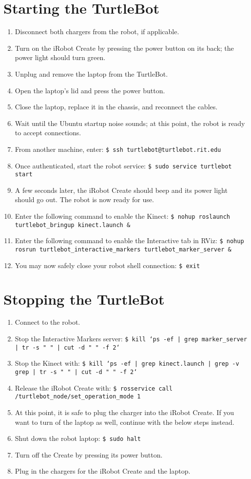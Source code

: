 \documentclass[12pt]{report}
\begin{document}
\section{Starting the TurtleBot}
\begin{enumerate}
\item{Disconnect both chargers from the robot, if applicable.}
\item{Turn on the iRobot Create by pressing the power button on its back; the power light should turn green.}
\item{Unplug and remove the laptop from the TurtleBot.}
\item{Open the laptop's lid and press the power button.}
\item{Close the laptop, replace it in the chassis, and reconnect the cables.}
\item{Wait until the Ubuntu startup noise sounds; at this point, the robot is ready to accept connections.}
\item{From another machine, enter: \texttt{\$\ ssh turtlebot@turtlebot.rit.edu}}
\item{Once authenticated, start the robot service: \texttt{\$\ sudo service turtlebot start}}
\item{A few seconds later, the iRobot Create should beep and its power light should go out.  The robot is now ready for use.}
\item{Enter the following command to enable the Kinect: \texttt{\$\ nohup roslaunch turtlebot\_bringup kinect.launch \&}}
\item{Enter the following command to enable the Interactive tab in RViz: \texttt{\$\ nohup rosrun turtlebot\_interactive\_markers turtlebot\_marker\_server \&}}
\item{You may now safely close your robot shell connection: \texttt{\$\ exit}}
\end{enumerate}

\section{Stopping the TurtleBot}
\begin{enumerate}
\item{Connect to the robot.}
\item{Stop the Interactive Markers server: \texttt{\$\ kill `ps -ef | grep marker\_server | tr -s " " | cut -d " " -f 2`}}
\item{Stop the Kinect with: \texttt{\$\ kill `ps -ef | grep kinect.launch | grep -v grep | tr -s " " | cut -d " " -f 2`}}
\item{Release the iRobot Create with: \texttt{\$\ rosservice call \\ /turtlebot\_node/set\_operation\_mode 1}}
\item{At this point, it is safe to plug the charger into the iRobot Create.  If you want to turn of the laptop as well, continue with the below steps instead.}
\item{Shut down the robot laptop: \texttt{\$\ sudo halt}}
\item{Turn off the Create by pressing its power button.}
\item{Plug in the chargers for the iRobot Create and the laptop.}
\end{enumerate}
\end{document}
